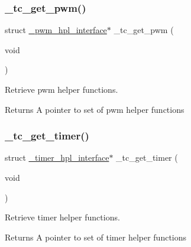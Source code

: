 \subsubsection{\texorpdfstring{\+\_\+tc\+\_\+get\+\_\+pwm()}{\_tc\_get\_pwm()}}
{\footnotesize\ttfamily struct \hyperlink{struct__pwm__hpl__interface}{\+\_\+pwm\+\_\+hpl\+\_\+interface}$\ast$ \+\_\+tc\+\_\+get\+\_\+pwm (\begin{DoxyParamCaption}\item[{void}]{ }\end{DoxyParamCaption})}



Retrieve pwm helper functions. 

\begin{DoxyReturn}{Returns}
A pointer to set of pwm helper functions 
\end{DoxyReturn}
\mbox{\label{group__tc__group_gaac375bec08b476a19a893e462affce95}} 
\subsubsection{\texorpdfstring{\+\_\+tc\+\_\+get\+\_\+timer()}{\_tc\_get\_timer()}}
{\footnotesize\ttfamily struct \hyperlink{struct__timer__hpl__interface}{\+\_\+timer\+\_\+hpl\+\_\+interface}$\ast$ \+\_\+tc\+\_\+get\+\_\+timer (\begin{DoxyParamCaption}\item[{void}]{ }\end{DoxyParamCaption})}



Retrieve timer helper functions. 

\begin{DoxyReturn}{Returns}
A pointer to set of timer helper functions 
\end{DoxyReturn}
